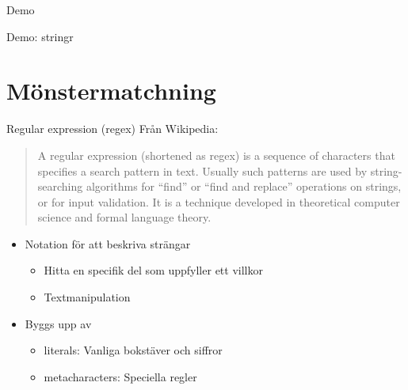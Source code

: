 \documentclass[
  10pt,
  ignorenonframetext,
  handout]{beamer}
\providecommand{\tightlist}{%
  \setlength{\itemsep}{0pt}\setlength{\parskip}{0pt}}
\begin{document}
\begin{frame}{Demo}
\label{demo}
\begin{block}{Demo: stringr}
\label{demo-stringr}
\end{block}
\end{frame}

\section{Mönstermatchning}\label{muxf6nstermatchning}

\begin{frame}{Regular expression (regex)}
\label{regular-expression-regex}
Från Wikipedia:

\begin{quote}
A regular expression (shortened as regex) is a sequence of characters
that specifies a search pattern in text. Usually such patterns are used
by string-searching algorithms for ``find'' or ``find and replace''
operations on strings, or for input validation. It is a technique
developed in theoretical computer science and formal language theory.
\end{quote}

\begin{itemize}
\tightlist
\item
  Notation för att beskriva strängar

  \begin{itemize}
  \tightlist
  \item
    Hitta en specifik del som uppfyller ett villkor
  \item
    Textmanipulation
  \end{itemize}
\item
  Byggs upp av

  \begin{itemize}
  \tightlist
  \item
    literals: Vanliga bokstäver och siffror
  \item
    metacharacters: Speciella regler
  \end{itemize}
\end{itemize}
\end{frame}
\end{document}
